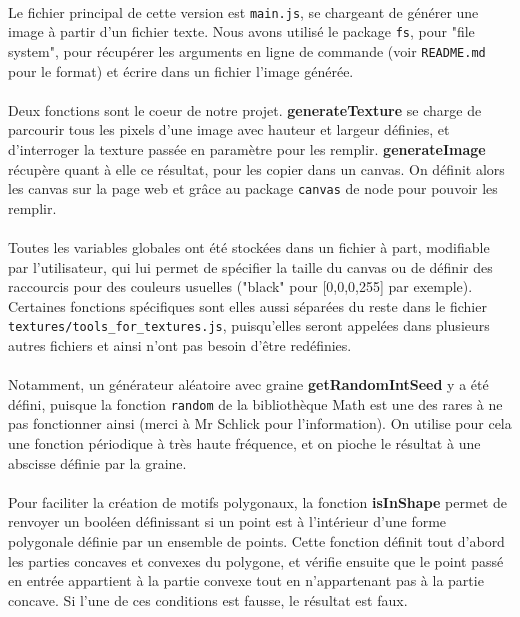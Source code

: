 \documentclass[a4paper]{article}
\begin{document}
\paragraph{}
Le fichier principal de cette version est \texttt{main.js}, se chargeant de générer une image à partir d'un fichier texte. Nous avons utilisé le package \texttt{fs}, pour "file system", pour récupérer les arguments en ligne de commande (voir \texttt{README.md} pour le format) et écrire dans un fichier l'image générée. 

\paragraph{}
Deux fonctions sont le coeur de notre projet. \textbf{generateTexture} se charge de parcourir tous les pixels d'une image avec hauteur et largeur définies, et d'interroger la texture passée en paramètre pour les remplir. \textbf{generateImage} récupère quant à elle ce résultat, pour les copier dans un canvas. On définit alors les canvas sur la page web et grâce au package \texttt{canvas} de node pour pouvoir les remplir.

\paragraph{}
Toutes les variables globales ont été stockées dans un fichier à part, modifiable par l'utilisateur, qui lui permet de spécifier la taille du canvas ou de définir des raccourcis pour des couleurs usuelles ("black" pour [0,0,0,255] par exemple). Certaines fonctions spécifiques sont elles aussi séparées du reste dans le fichier \texttt{textures/tools\_for\_textures.js}, puisqu'elles seront appelées dans plusieurs autres fichiers et ainsi n'ont pas besoin d'être redéfinies.

\paragraph{}
Notamment, un générateur aléatoire avec graine \textbf{getRandomIntSeed} y a été défini, puisque la fonction \texttt{random} de la bibliothèque Math est une des rares à ne pas fonctionner ainsi (merci à Mr Schlick\cite{seed} pour l'information). On utilise pour cela une fonction périodique à très haute fréquence, et on pioche le résultat à une abscisse définie par la graine.

\paragraph{}
Pour faciliter la création de motifs polygonaux, la fonction \textbf{isInShape} permet de renvoyer un booléen définissant si un point est à l'intérieur d'une forme polygonale définie par un ensemble de points. Cette fonction définit tout d'abord les parties concaves et convexes du polygone, et vérifie ensuite que le point passé en entrée appartient à la partie convexe tout en n'appartenant pas à la partie concave. Si l'une de ces conditions est fausse, le résultat est faux.
\end{document}

